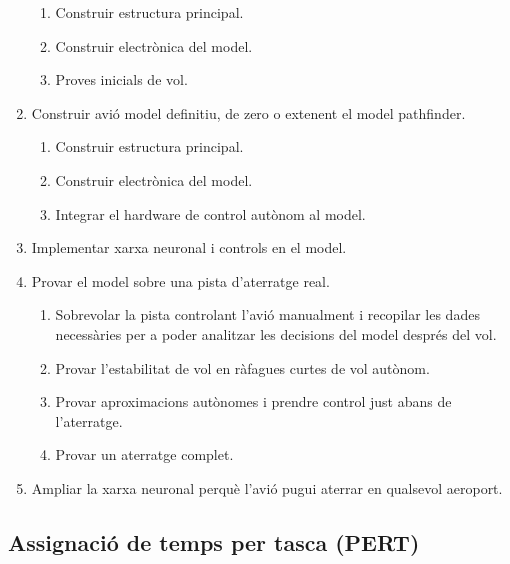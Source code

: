 \documentclass[10pt,a4paper,twocolumn,twoside]{article}
\begin{document}
\begin{enumerate}
\begin{enumerate}[label*=\arabic*.]
        \item Construir estructura principal.
        \item Construir electrònica del model.
        \item Proves inicials de vol.
    \end{enumerate}
    \item Construir avió model definitiu, de zero o extenent el model pathfinder.
    \begin{enumerate}[label*=\arabic*.]
        \item Construir estructura principal.
        \item Construir electrònica del model.
        \item Integrar el hardware de control autònom al model.
    \end{enumerate}
    \item Implementar xarxa neuronal i controls en el model.
    \item Provar el model sobre una pista d'aterratge real.
    \begin{enumerate}[label*=\arabic*.]
        \item Sobrevolar la pista controlant l'avió manualment i recopilar les dades necessàries per a poder analitzar les decisions del model després del vol.
        \item Provar l'estabilitat de vol en ràfagues curtes de vol autònom.
        \item Provar aproximacions autònomes i prendre control just abans de l'aterratge.
        \item Provar un aterratge complet.
    \end{enumerate}
    \item Ampliar la xarxa neuronal perquè l'avió pugui aterrar en qualsevol aeroport.
\end{enumerate}


\subsection {Assignació de temps per tasca (PERT)}
\end{document}
